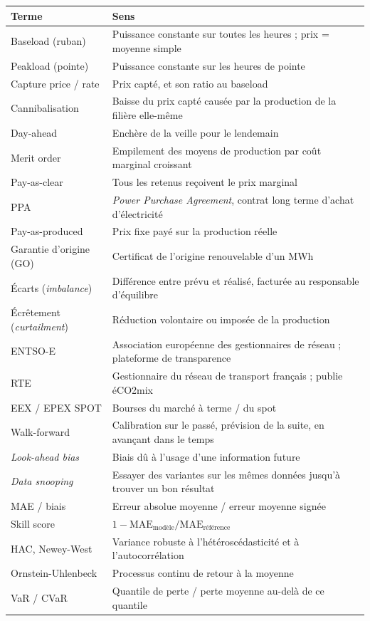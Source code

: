 \documentclass[11pt,a4paper]{article}
\newcommand{\MAE}{\mathrm{MAE}}
\begin{document}
\begin{center}
\small
\begin{tabularx}{\linewidth}{lY}
\toprule
\textbf{Terme} & \textbf{Sens} \\
\midrule
Baseload (ruban) & Puissance constante sur toutes les heures ; prix = moyenne simple \\
Peakload (pointe) & Puissance constante sur les heures de pointe \\
Capture price / rate & Prix capté, et son ratio au baseload \\
Cannibalisation & Baisse du prix capté causée par la production de la filière elle-même \\
Day-ahead & Enchère de la veille pour le lendemain \\
Merit order & Empilement des moyens de production par coût marginal croissant \\
Pay-as-clear & Tous les retenus reçoivent le prix marginal \\
PPA & \emph{Power Purchase Agreement}, contrat long terme d'achat d'électricité \\
Pay-as-produced & Prix fixe payé sur la production réelle \\
Garantie d'origine (GO) & Certificat de l'origine renouvelable d'un MWh \\
Écarts (\emph{imbalance}) & Différence entre prévu et réalisé, facturée au responsable d'équilibre \\
Écrêtement (\emph{curtailment}) & Réduction volontaire ou imposée de la production \\
ENTSO-E & Association européenne des gestionnaires de réseau ; plateforme de transparence \\
RTE & Gestionnaire du réseau de transport français ; publie éCO2mix \\
EEX / EPEX SPOT & Bourses du marché à terme / du spot \\
Walk-forward & Calibration sur le passé, prévision de la suite, en avançant dans le temps \\
\emph{Look-ahead bias} & Biais dû à l'usage d'une information future \\
\emph{Data snooping} & Essayer des variantes sur les mêmes données jusqu'à trouver un bon résultat \\
MAE / biais & Erreur absolue moyenne / erreur moyenne signée \\
Skill score & $1 - \MAE_{\text{modèle}} / \MAE_{\text{référence}}$ \\
HAC, Newey-West & Variance robuste à l'hétéroscédasticité et à l'autocorrélation \\
Ornstein-Uhlenbeck & Processus continu de retour à la moyenne \\
VaR / CVaR & Quantile de perte / perte moyenne au-delà de ce quantile \\
\bottomrule
\end{tabularx}
\end{center}
\end{document}
